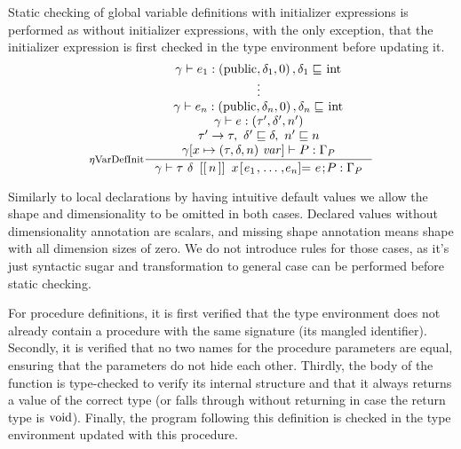 \documentclass[a4paper, 10pt, draft]{report}
\newcommand{\mycode}[1]{\ensuremath{\mbox{\lstinline{#1}}}}
\begin{document}
Static checking of global variable definitions with initializer expressions is
performed as without initializer expressions, with the only exception, that the
initializer expression is first checked in the type environment before updating
it.
\[ \inference[$\eta$VarDefInit]{
  \gamma |- e_1 : \left( \mycode{public}, \delta_1, 0 \right), \delta_1 \sqsubseteq \mycode{int} \\
  \vdots \\
  \gamma |- e_n : \left( \mycode{public}, \delta_n, 0 \right), \delta_n \sqsubseteq \mycode{int} \\
  \gamma |- e : \left( \tau', \delta', n' \right) \\
  \tau' \to \tau,\ \delta' \sqsubseteq \delta,\ n' \sqsubseteq n \\
  \gamma[x \mapsto (\tau, \delta, n)\ \mathit{var}] |- P : \Gamma_P
}{
  \gamma |- \tau\ \delta\ \mycode{[[}n\mycode{]]}\ x\mycode{[} e_1 \mycode{,} \ldots \mycode{,} e_n  \mycode{]=}\ e\mycode{;} P : \Gamma_P
} \]

Similarly to local declarations by having intuitive default values we allow the
shape and dimensionality to be omitted in both cases. Declared values without
dimensionality annotation are scalars, and missing shape annotation means shape
with all dimension sizes of zero. We do not introduce rules for those cases, as
it's just syntactic sugar and transformation to general case can be performed
before static checking.

For procedure definitions, it is first verified that the type environment does
not already contain a procedure with the same signature (its mangled
identifier). Secondly, it is verified that no two names for the procedure
parameters are equal, ensuring that the parameters do not hide each other.
Thirdly, the body of the function is type-checked to verify its internal
structure and that it always returns a value of the correct type (or falls
through without returning in case the return type is \mycode{void}).  Finally,
the program following this definition is checked in the type environment
updated with this procedure.
\end{document}
